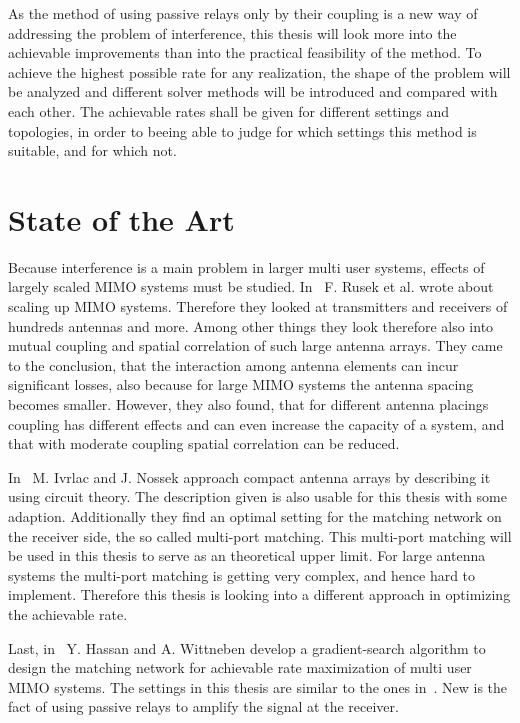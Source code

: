 As the method of using passive relays only by their coupling is a new way of addressing the problem of interference, this thesis will look more into the achievable improvements than into the practical feasibility of the method.
To achieve the highest possible rate for any realization, the shape of the problem will be analyzed and different solver methods will be introduced and compared with each other.
The achievable rates shall be given for different settings and topologies, in order to beeing able to judge for which settings this method is suitable, and for which not.

\section{State of the Art}
\label{sec:SoA}

Because interference is a main problem in larger multi user systems, effects of largely scaled MIMO systems must be studied.
In~\cite{rusek13} F. Rusek et al. wrote about scaling up MIMO systems.
Therefore they looked at transmitters and receivers of hundreds antennas and more.
Among other things they look therefore also into mutual coupling and spatial correlation of such large antenna arrays.
They came to the conclusion, that the interaction among antenna elements can incur significant losses, also because for large MIMO systems the antenna spacing becomes smaller.
However, they also found, that for different antenna placings coupling has different effects and can even increase the capacity of a system, and that with moderate coupling spatial correlation can be reduced.

In~\cite{Nossek} M. Ivrlac and J. Nossek approach compact antenna arrays by describing it using circuit theory.
The description given is also usable for this thesis with some adaption.
Additionally they find an optimal setting for the matching network on the receiver side, the so called multi-port matching.
This multi-port matching will be used in this thesis to serve as an theoretical upper limit.
For large antenna systems the multi-port matching is getting very complex, and hence hard to implement.
Therefore this thesis is looking into a different approach in optimizing the achievable rate. 

Last, in~\cite{Yahia2013} Y. Hassan and A. Wittneben develop a gradient-search algorithm to design the matching network for achievable rate maximization of multi user MIMO systems.
The settings in this thesis are similar to the ones in~\cite{Yahia2013}.
New is the fact of using passive relays to amplify the signal at the receiver.

